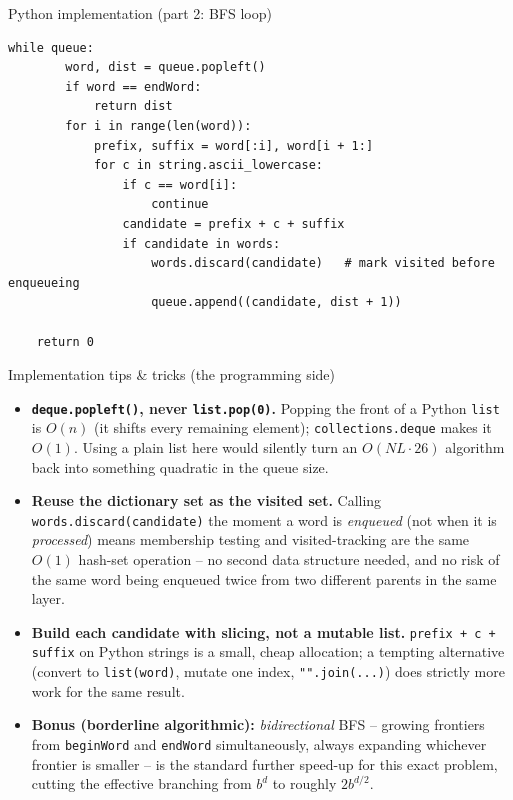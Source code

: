 \documentclass[11pt,aspectratio=169]{beamer}
\begin{document}
\begin{frame}[fragile]{Python implementation (part 2: BFS loop)}
  \begin{lstlisting}[style=py]
    while queue:
        word, dist = queue.popleft()
        if word == endWord:
            return dist
        for i in range(len(word)):
            prefix, suffix = word[:i], word[i + 1:]
            for c in string.ascii_lowercase:
                if c == word[i]:
                    continue
                candidate = prefix + c + suffix
                if candidate in words:
                    words.discard(candidate)   # mark visited before enqueueing
                    queue.append((candidate, dist + 1))

    return 0
  \end{lstlisting}
\end{frame}

\begin{frame}{Implementation tips \& tricks (the programming side)}
  \small
  \begin{itemize}
    \item \textbf{\texttt{deque.popleft()}, never \texttt{list.pop(0)}.} Popping the
    front of a Python \texttt{list} is $O(n)$ (it shifts every remaining element);
    \texttt{collections.deque} makes it $O(1)$. Using a plain list here would silently
    turn an $O(NL\cdot26)$ algorithm back into something quadratic in the queue size.
    \item \textbf{Reuse the dictionary set as the visited set.} Calling
    \texttt{words.discard(candidate)} the moment a word is \emph{enqueued} (not when it
    is \emph{processed}) means membership testing and visited-tracking are the same
    $O(1)$ hash-set operation -- no second data structure needed, and no risk of the
    same word being enqueued twice from two different parents in the same layer.
    \item \textbf{Build each candidate with slicing, not a mutable list.}
    \texttt{prefix + c + suffix} on Python strings is a small, cheap allocation; a
    tempting alternative (convert to \texttt{list(word)}, mutate one index, \texttt{"".join(...)}) does strictly more work for the same result.
    \item \textbf{Bonus (borderline algorithmic):} \emph{bidirectional} BFS -- growing
    frontiers from \texttt{beginWord} and \texttt{endWord} simultaneously, always
    expanding whichever frontier is smaller -- is the standard further speed-up for
    this exact problem, cutting the effective branching from $b^d$ to roughly
    $2b^{d/2}$.
  \end{itemize}
\end{frame}
\end{document}
